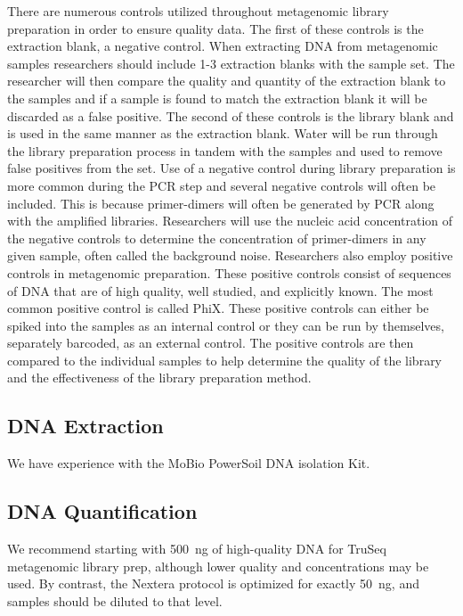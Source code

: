 \documentclass[graybox]{svmult}
\begin{document}
There are numerous controls utilized throughout metagenomic library preparation in order to ensure quality data. The first of these controls is the extraction blank, a negative control. When extracting DNA from metagenomic samples researchers should include 1-3 extraction blanks with the sample set. The researcher will then compare the quality and quantity of the extraction blank to the samples and if a sample is found to match the extraction blank it will be discarded as a false positive.
%
The second of these controls is the library blank and is used in the same manner as the extraction blank. Water will be run through the library preparation process in tandem with the samples and used to remove false positives from the set.
%
Use of a negative control during library preparation is more common during the PCR step and several negative controls will often be included. This is because primer-dimers will often be generated by PCR along with the amplified libraries. Researchers will use the nucleic acid concentration of the negative controls to determine the concentration of primer-dimers in any given sample, often called the background noise.
%
Researchers also employ positive controls in metagenomic preparation. These positive controls consist of sequences of DNA that are of high quality, well studied, and explicitly known. The most common positive control is called PhiX. These positive controls can either be spiked into the samples as an internal control or they can be run by themselves, separately barcoded, as an external control. The positive controls are then compared to the individual samples to help determine the quality of the library and the effectiveness of the library preparation method. 

\subsection{DNA Extraction}
We have experience with the MoBio PowerSoil DNA isolation Kit.  

\subsection{DNA Quantification}

We recommend starting with 500~ng of high-quality DNA for TruSeq metagenomic library prep, although lower quality and concentrations may be used. By contrast, the Nextera protocol is optimized for exactly 50~ng, and samples should be diluted to that level.
\end{document}
